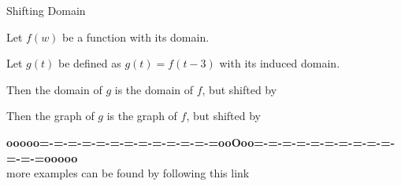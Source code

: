 \documentclass{ximera}
\begin{document}
\begin{example} Shifting Domain


Let $f(w)$ be a function with its domain.

Let $g(t)$ be defined as $g(t) = f(t-3)$ with its induced domain.


Then the domain of $g$ is the domain of $f$, but shifted  by 


Then the graph of $g$ is the graph of $f$, but shifted  by 




\end{example}


















\begin{center}
\textbf{\textcolor{green!50!black}{ooooo=-=-=-=-=-=-=-=-=-=-=-=-=ooOoo=-=-=-=-=-=-=-=-=-=-=-=-=ooooo}} \\

more examples can be found by following this link\\ 

\end{center}
\end{document}
